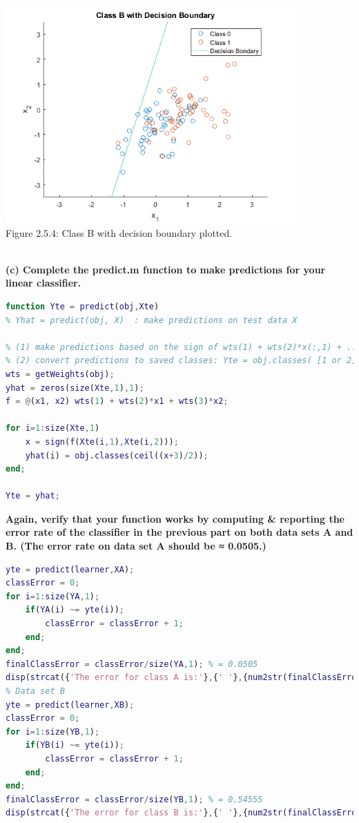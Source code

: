 \documentclass[]{report}   %
\begin{document}
\begin{center}
	\includegraphics[width=30em,keepaspectratio]{2_5_Figure_4.png}\\
	{Figure 2.5.4: Class B with decision boundary plotted.}
\end{center} 
~\\
{\bf (c) Complete the predict.m function to make predictions for your linear classifier.}
\begin{lstlisting}[language=Matlab, caption=predict() Implementation]
function Yte = predict(obj,Xte)
% Yhat = predict(obj, X)  : make predictions on test data X

% (1) make predictions based on the sign of wts(1) + wts(2)*x(:,1) + ...
% (2) convert predictions to saved classes: Yte = obj.classes( [1 or 2] );
wts = getWeights(obj);
yhat = zeros(size(Xte,1),1);
f = @(x1, x2) wts(1) + wts(2)*x1 + wts(3)*x2;

for i=1:size(Xte,1)
    x = sign(f(Xte(i,1),Xte(i,2)));
    yhat(i) = obj.classes(ceil((x+3)/2));
end;

Yte = yhat;
\end{lstlisting}
{\bf Again, verify that your function works by computing \& reporting the error rate of the classifier in the previous part on both data sets A and B. (The error rate on data set A should be ≈ 0.0505.)}
\begin{lstlisting}[language=Matlab, caption=Verifying predict() works]
% Data set A
yte = predict(learner,XA);
classError = 0;
for i=1:size(YA,1);
    if(YA(i) ~= yte(i));
        classError = classError + 1;
    end;
end;
finalClassError = classError/size(YA,1); % = 0.0505
disp(strcat({'The error for class A is:'},{' '},{num2str(finalClassError,' %.4f')}));
% Data set B
yte = predict(learner,XB);
classError = 0;
for i=1:size(YB,1);
    if(YB(i) ~= yte(i));
        classError = classError + 1;
    end;
end;
finalClassError = classError/size(YB,1); % = 0.54555
disp(strcat({'The error for class B is:'},{' '},{num2str(finalClassError,' %.4f')}));
\end{lstlisting}
\end{document}
